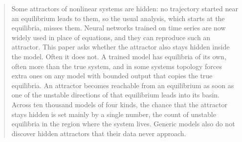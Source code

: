 \begin{quotation}
Some attractors of nonlinear systems are hidden: no trajectory started near an equilibrium leads to them, so the usual
analysis, which starts at the equilibria, misses them. Neural networks trained on time series are now widely used in place
of equations, and they can reproduce such an attractor. This paper asks whether the attractor also stays hidden inside the
model. Often it does not. A trained model has equilibria of its own, often more than the true system, and in some systems
topology forces extra ones on any model with bounded output that copies the true equilibria. An attractor becomes
reachable from an equilibrium as soon as one of the unstable directions of that equilibrium leads into its basin. Across
ten thousand models of four kinds, the chance that the attractor stays hidden is set mainly by a single number, the count
of unstable equilibria in the region where the system lives. Generic models also do not discover hidden attractors that their data never
approach.
\end{quotation}
